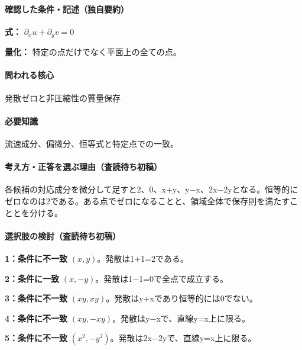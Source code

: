 \paragraph{確認した条件・記述（独自要約）}\mbox{}\par

\noindent\textbf{式：} \(\partial_xu+\partial_yv=0\)\par

\noindent\textbf{量化：} 特定の点だけでなく平面上の全ての点。\par

\paragraph{問われる核心} 発散ゼロと非圧縮性の質量保存

\paragraph{必要知識} 流速成分、偏微分、恒等式と特定点での一致。

\paragraph{考え方・正答を選ぶ理由（査読待ち初稿）} 各候補の対応成分を微分して足すと2、0、x+y、y−x、2x−2yとなる。恒等的にゼロなのは2である。ある点でゼロになることと、領域全体で保存則を満たすこととを分ける。

\paragraph{選択肢の検討（査読待ち初稿）}\mbox{}\par

\noindent\textbf{1：条件に不一致} \((x,y)\)。発散は1+1=\allowbreak{}2である。\par

\noindent\textbf{2：条件に一致} \((x,-y)\)。発散は1−1=\allowbreak{}0で全点で成立する。\par

\noindent\textbf{3：条件に不一致} \((xy,xy)\)。発散はy+xであり恒等的には0でない。\par

\noindent\textbf{4：条件に不一致} \((xy,-xy)\)。発散はy−xで、直線y=\allowbreak{}x上に限る。\par

\noindent\textbf{5：条件に不一致} \((x^2,-y^2)\)。発散は2x−2yで、直線y=\allowbreak{}x上に限る。\par

